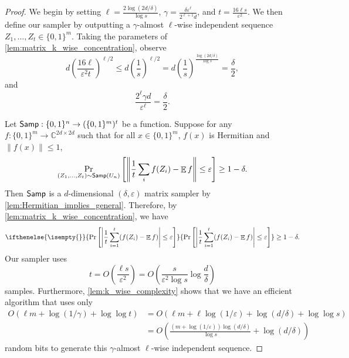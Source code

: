 \documentclass[11pt,letterpaper]{article}
\newcommand{\C}{\mathbb{C}}
\DeclareMathOperator*{\E}{\mathbb{E}}
\newcommand{\eps}{\varepsilon}
\newcommand{\1}{\mathbbm{1}}
\newcommand{\norm}[1]{\left\lVert #1\right\rVert}
\newcommand{\abs}[1]{\left|#1\right| }
\newcommand{\tuple}[1]{\left(#1\right)}
\newcommand{\zo}{\{0, 1\}}
\newcommand{\Smp}{\textup{\textsf{Samp}}}
\newcommand{\Prb}[2][]{ \ifthenelse{\isempty{#1}}
  {\Pr\left[#2\right]}
  {\Pr_{#1}\left[#2\right]} }
\begin{document}
\begin{proof}
    We begin by setting $\ell = \frac{2\log(2d / \delta)}{\log s}$, $\gamma = \frac{\delta\eps^\ell}{2^{\ell + 1}d}$,  and $t = \frac{16\ell s}{\eps^{2}}$. We then define our sampler by outputting a $\gamma$-almost $\ell$-wise independent  sequence $Z_1, \dots, Z_t \in \zo^m$. 
    Taking the parameters of \cref{lem:matrix_k_wise_concentration}, observe \[
    d \left( \frac{16\ell}{\eps^2 t} \right)^{\ell/2}  \le d\tuple{\frac{1}{{s}}}^{\ell / 2} = d\tuple{\frac{1}{{s}}}^{\frac{\log(2d/\delta)}{\log s}}
        =  \frac{\delta}{2},
    \]
    and \[
        \frac{2^\ell\gamma d}{\eps^\ell} = \frac{\delta}{2}.
    \]

     Let $\Smp: \zo^n \to (\zo^m)^t$ be a function. Suppose for any $f: \zo^m \to \C^{2d\times 2d}$ such that for all $x \in \zo^m$, $f(x)$ is Hermitian and $\|f(x)\| \le 1$,     \[
    \Pr_{(Z_1, \dots, Z_t) \sim \Smp(U_n)}
    \left[ \norm{\frac{1}{t}  \sum_i f(Z_i) - \E f} \leq \varepsilon \right]
    \geq 1 - \delta.
    \]
    Then $\Smp$ is a $d$-dimensional $(\delta, \eps)$ matrix sampler by \cref{lem:Hermitian_implies_general}.
     Therefore, by \cref{lem:matrix_k_wise_concentration}, we have \[
        \Prb{\abs{\frac{1}{t}\sum_{i=1}^t (f(Z_i) - \E f)} \le \eps} \ge 1 - \delta.
    \]
    Our sampler uses \[
        t = O\tuple{\frac{\ell s}{\eps^2}} = O\tuple{\frac{s}{\eps^2 \log s}\log\frac{d}{\delta}}
    \]
    samples.
     Furthermore, \cref{lem:k_wise_complexity} shows that we have an efficient algorithm that uses only 
     \begin{align*}
         O(\ell m + \log (1 / \gamma) + \log\log t) &=  O\tuple{\ell m + \ell\log(1 / \eps)  + \log(d / \delta) +  \log\log s} \\
         &=  O\tuple{\frac{(m + \log(1/\eps)) \log (d / \delta)}{\log s} + \log (d / \delta)} 
     \end{align*}
     random bits to generate this $\gamma$-almost $\ell$-wise independent  sequence.
\end{proof}
\end{document}
